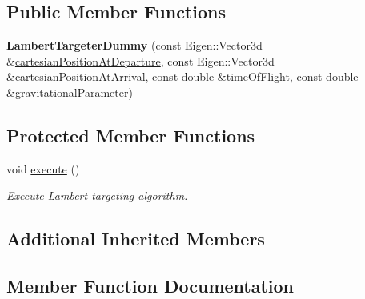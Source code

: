 \subsection*{Public Member Functions}
\begin{DoxyCompactItemize}
\item 
{\bfseries Lambert\+Targeter\+Dummy} (const Eigen\+::\+Vector3d \&\hyperlink{classtudat_1_1mission__segments_1_1LambertTargeter_a67d3a9e1b514c0ca2dad3f235c46941b}{cartesian\+Position\+At\+Departure}, const Eigen\+::\+Vector3d \&\hyperlink{classtudat_1_1mission__segments_1_1LambertTargeter_ab710c1fabfd56361c457449c99efd5fa}{cartesian\+Position\+At\+Arrival}, const double \&\hyperlink{classtudat_1_1mission__segments_1_1LambertTargeter_a74f0ac221b22693ba7fe0b7398007e9b}{time\+Of\+Flight}, const double \&\hyperlink{classtudat_1_1mission__segments_1_1LambertTargeter_ab22c920bfc0f13cdfee122fa2bb93ea2}{gravitational\+Parameter})\hypertarget{classtudat_1_1mission__segments_1_1LambertTargeterDummy_a9bdd3cd1b58a685490c68bd6c9b699d2}{}\label{classtudat_1_1mission__segments_1_1LambertTargeterDummy_a9bdd3cd1b58a685490c68bd6c9b699d2}

\end{DoxyCompactItemize}
\subsection*{Protected Member Functions}
\begin{DoxyCompactItemize}
\item 
void \hyperlink{classtudat_1_1mission__segments_1_1LambertTargeterDummy_a2af97bf82a51fcec65e57e0802ef7118}{execute} ()
\begin{DoxyCompactList}\small\item\em Execute Lambert targeting algorithm. \end{DoxyCompactList}\end{DoxyCompactItemize}
\subsection*{Additional Inherited Members}


\subsection{Member Function Documentation}
